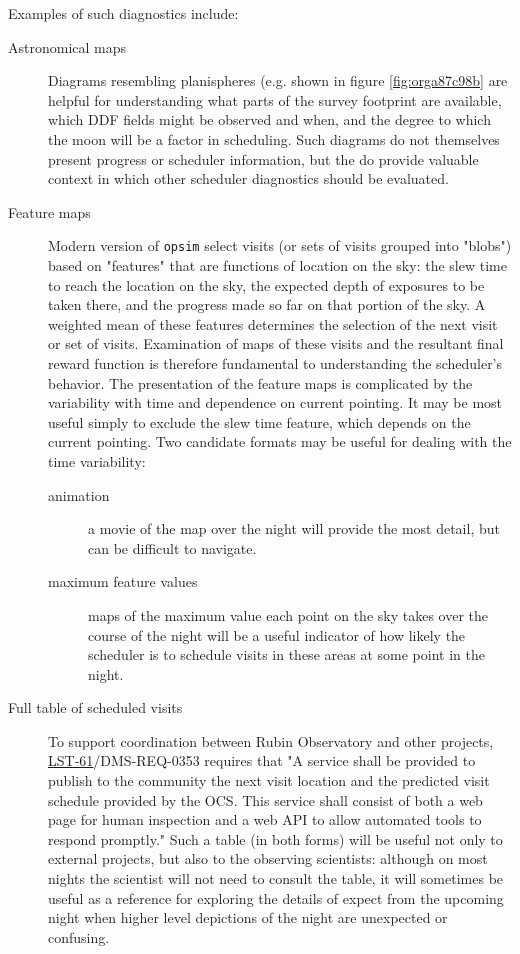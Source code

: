 Examples of such diagnostics include:
\begin{description}
\item[{Astronomical maps}] Diagrams resembling planispheres (e.g. shown in figure \ref{fig:orga87c98b} are helpful for understanding what parts of the survey footprint are available, which DDF fields might be observed and when, and the degree to which the moon will be a factor in scheduling. Such diagrams do not themselves present progress or scheduler information, but the do provide valuable context in which other scheduler diagnostics should be evaluated.
\item[{Feature maps}] Modern version of \texttt{opsim} select visits (or sets of visits grouped into "blobs") based on "features" that are functions of location on the sky: the slew time to reach the location on the sky, the expected depth of exposures to be taken there, and the progress made so far on that portion of the sky. A weighted mean of these features determines the selection of the next visit or set of visits. Examination of maps of these visits and the resultant final reward function is therefore fundamental to understanding the scheduler's behavior. The presentation of the feature maps is complicated by the variability with time and dependence on current pointing. It may be most useful simply to exclude the slew time feature, which depends on the current pointing. Two candidate formats may be useful for dealing with the time variability:
\begin{description}
\item[{animation}] a movie of the map over the night will provide the most detail, but can be difficult to navigate.
\item[{maximum feature values}] maps of the maximum value each point on the sky takes over the course of the night will be a useful indicator of how likely the scheduler is to schedule visits in these areas at some point in the night.
\end{description}
\item[{Full table of scheduled visits}] To support coordination between Rubin Observatory and other projects, \href{https://ls.st/lse-61}{LST-61}/DMS-REQ-0353 requires that "A service shall be provided to publish to the community the next visit location and the predicted visit schedule provided by the OCS. This service shall consist of both a web page for human inspection and a web API to allow automated tools to respond promptly." Such a table (in both forms) will be useful not only to external projects, but also to the observing scientists: although on most nights the scientist will not need to consult the table, it will sometimes be useful as a reference for exploring the details of expect from the upcoming night when higher level depictions of the night are unexpected or confusing.

\end{description}
